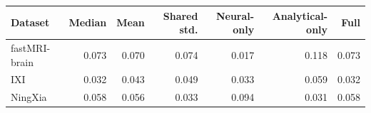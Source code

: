 \begin{tabular}{lrrrrrr}
\toprule
Dataset & Median & Mean & Shared std. & Neural-only & Analytical-only & Full \\
\midrule
fastMRI-brain & 0.073 & 0.070 & 0.074 & 0.017 & 0.118 & 0.073 \\
IXI & 0.032 & 0.043 & 0.049 & 0.033 & 0.059 & 0.032 \\
NingXia & 0.058 & 0.056 & 0.033 & 0.094 & 0.031 & 0.058 \\
\bottomrule
\end{tabular}
